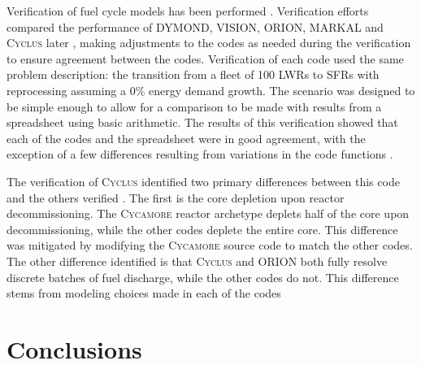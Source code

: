 \documentclass{article}
\newcommand{\Cyclus}{\textsc{Cyclus}\xspace}%
\newcommand{\Cycamore}{\textsc{Cycamore}\xspace}%
\begin{document}
    Verification of fuel cycle models has been performed
    \cite{feng_standardized_2016,bae_standardized_2019}. Verification efforts
    compared the performance of DYMOND, VISION, ORION, MARKAL 
    \cite{feng_standardized_2016} and \Cyclus later \cite{bae_standardized_2019}, 
    making adjustments to the codes as needed
    during the verification to ensure agreement between the codes. Verification 
    of each code used the same problem description: the transition from 
    a fleet of 100 \glspl{LWR} to \glspl{SFR} with reprocessing assuming a
    0\% energy demand growth.  
    The scenario was designed to be simple enough to allow for a comparison 
    to be made with results from a spreadsheet using basic arithmetic. The 
    results of this 
    verification showed that each of the codes and the spreadsheet were in 
    good agreement, with the exception of a few differences resulting from 
    variations in the code functions \cite{feng_standardized_2016}.

    The verification of \Cyclus identified two primary differences between 
    this code and the others verified \cite{bae_standardized_2019}. The 
    first is the core depletion upon reactor decommissioning. The \Cycamore
    reactor archetype deplets half of the core upon decommissioning, while the 
    other codes deplete the entire core. This difference was mitigated by 
    modifying the \Cycamore source code to match the other codes. The other 
    difference identified is that \Cyclus and ORION both fully resolve 
    discrete batches of fuel discharge, while the other codes do not. This 
    difference stems from modeling choices made in each of the codes 

    

    \section{Conclusions}

% 

   
\end{document}
